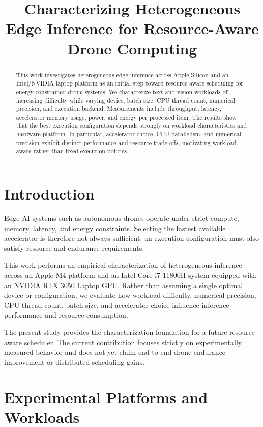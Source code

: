 \documentclass[conference]{IEEEtran}
\title{Characterizing Heterogeneous Edge Inference for Resource-Aware Drone Computing}
\author{
\IEEEauthorblockN{Author Name}
\IEEEauthorblockA{
Department / University\\
Email
}
}
\begin{document}
\maketitle

\begin{abstract}
This work investigates heterogeneous edge inference across Apple Silicon and an Intel/NVIDIA laptop platform as an initial step toward resource-aware scheduling for energy-constrained drone systems. We characterize text and vision workloads of increasing difficulty while varying device, batch size, CPU thread count, numerical precision, and execution backend. Measurements include throughput, latency, accelerator memory usage, power, and energy per processed item. The results show that the best execution configuration depends strongly on workload characteristics and hardware platform. In particular, accelerator choice, CPU parallelism, and numerical precision exhibit distinct performance and resource trade-offs, motivating workload-aware rather than fixed execution policies.
\end{abstract}

\section{Introduction}

Edge AI systems such as autonomous drones operate under strict compute, memory, latency, and energy constraints. Selecting the fastest available accelerator is therefore not always sufficient: an execution configuration must also satisfy resource and endurance requirements.

This work performs an empirical characterization of heterogeneous inference across an Apple M4 platform and an Intel Core i7-11800H system equipped with an NVIDIA RTX 3050 Laptop GPU. Rather than assuming a single optimal device or configuration, we evaluate how workload difficulty, numerical precision, CPU thread count, batch size, and accelerator choice influence inference performance and resource consumption.

The present study provides the characterization foundation for a future resource-aware scheduler. The current contribution focuses strictly on experimentally measured behavior and does not yet claim end-to-end drone endurance improvement or distributed scheduling gains.

\section{Experimental Platforms and Workloads}
\end{document}
